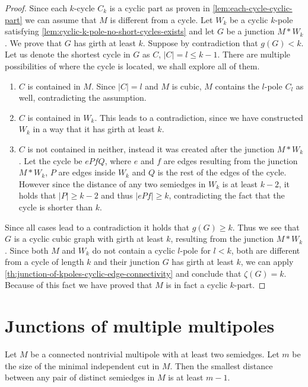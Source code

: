 \documentclass[12pt, twoside]{book}
\begin{document}
\begin{proof}
	Since each $k$-cycle $C_k$ is a cyclic part as proven in \cref{lem:each-cycle-cyclic-part} we can assume that $M$ is different from a cycle. Let $W_k$ be a cyclic $k$-pole satisfying \cref{lem:cyclic-k-pole-no-short-cycles-exists} and let $G$ be a junction $M*W_k$. We prove that $G$ has girth at least $k$. Suppose by contradiction that $g(G)<k$. Let us denote the shortest cycle in $G$ as $C$, $|C|=l\leq k-1$. There are multiple possibilities of where the cycle is located, we shall explore all of them.
	\begin{enumerate}
		\item $C$ is contained in $M$. Since $|C|=l$ and $M$ is cubic, $M$ contains the $l$-pole $C_l$ as well, contradicting the assumption.
		\item $C$ is contained in $W_k$. This leads to a contradiction, since we have constructed $W_k$ in a way that it has girth at least $k$.
		\item $C$ is not contained in neither, instead it was created after the junction $M*W_k$. Let the cycle be $ePfQ$, where $e$ and $f$ are edges resulting from the junction $M*W_k$, $P$ are edges inside $W_k$ and $Q$ is the rest of the edges of the cycle. However since the distance of any two semiedges in $W_k$ is at least $k-2$, it holds that $|P|\geq k-2$ and thus $|ePf|\geq k$, contradicting the fact that the cycle is shorter than $k$.
	\end{enumerate}

	Since all cases lead to a contradiction it holds that $g(G)\geq k$. Thus we see that $G$ is a cyclic cubic graph with girth at least $k$, resulting from the junction $M*W_k$. Since both $M$ and $W_k$ do not contain a cyclic $l$-pole for $l<k$, both are different from a cycle of length $k$ and their junction $G$ has girth at least $k$, we can apply \cref{th:junction-of-kpoles-cyclic-edge-connectivity} and conclude that $\zeta(G)=k$. Because of this fact we have proved that $M$ is in fact a cyclic $k$-part.
\end{proof}


\section{Junctions of multiple multipoles}

\begin{lemma}\label{le:mi-implies-distance}	
	Let $M$ be a connected nontrivial multipole with at least two semiedges. Let $m$ be the size of the minimal independent cut in $M$. Then the smallest distance between any pair of distinct semiedges in $M$ is at least $m-1$.
\end{lemma}
\end{document}
